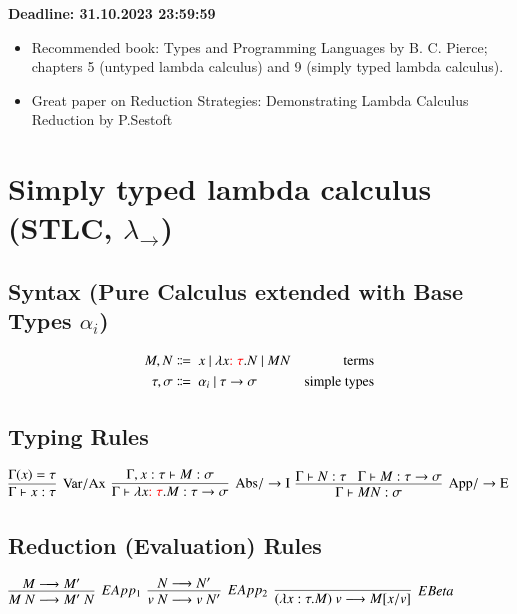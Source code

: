 \documentclass[9pt]{article}
\begin{document}
\textbf{Deadline: 31.10.2023 23:59:59}

\begin{itemize}
    \item Recommended book: Types and Programming Languages by B. C. Pierce;
          chapters 5 (untyped lambda calculus) and 9 (simply typed lambda calculus).
    \item Great paper on Reduction Strategies: Demonstrating Lambda Calculus Reduction by P.Sestoft
\end{itemize}

\section{Simply typed lambda calculus (STLC, $\lambda_{\to}$)}
\subsection{Syntax (Pure Calculus extended with Base Types $\alpha_i$)}
\begin{align*}
    M,N          & \Coloneqq\ x\ |\ \lambda x {\color{red} : \tau} . N\ |\ M N & \textnormal{terms}        \\
    \tau, \sigma & \Coloneqq\ \alpha_{i}\ |\ \tau \to \sigma                   & \textnormal{simple types}
\end{align*}

\subsection{Typing Rules}

{
    $\infer[\mathrm{Var/Ax}]{\Gamma \vdash x:\tau}{\Gamma (x) = \tau}$
    \hspace{1.5cm}
    $\infer[\mathrm{Abs/\to I}]{\Gamma \vdash \lambda x {\color{red}: \tau} . M : \tau \to \sigma}
        {\Gamma, x :\tau \vdash M : \sigma }$
    \hspace{1cm}
    $\infer[\mathrm{App/\to E}]{\Gamma \vdash M N :\sigma}{\Gamma \vdash N : \tau \;\;\;
            \Gamma \vdash M : \tau \to \sigma}$
}

\subsection{Reduction (Evaluation) Rules}

$\infer[EApp_1]{M\ N \longrightarrow M'\ N}{M \longrightarrow M'}$
\hspace{1cm}
$\infer[EApp_2]{v\ N \longrightarrow v\ N'}{N \longrightarrow N'}$
\hspace{1cm}
$\infer[EBeta]{(\lambda x : \tau . M)\ v \longrightarrow M[x/v]}{}$
\end{document}
